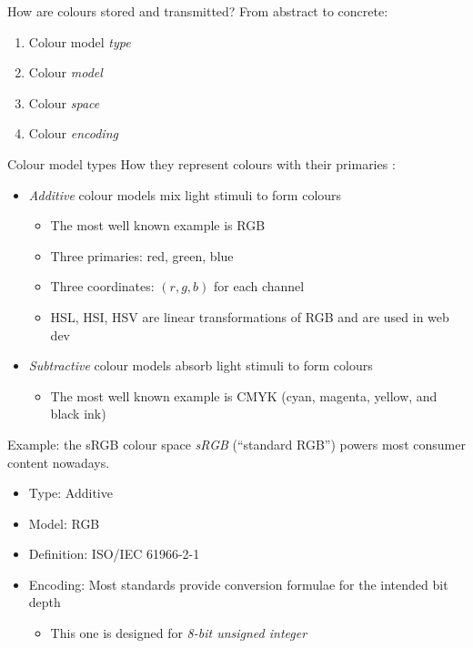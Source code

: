 \documentclass[aspectratio=169,usepdftitle=false]{fireshonks}
\begin{document}
\begin{frame}{How are colours stored and transmitted?}
    From abstract to concrete:
    \begin{enumerate}
        \item Colour model \emph{type}
        \item Colour \emph{model}
        \item Colour \emph{space}
        \item Colour \emph{encoding}
    \end{enumerate}
\end{frame}
\begin{frame}{Colour model types}
    How they represent colours with their primaries \autocite{allen23}:
    \begin{itemize}
        \item \emph{Additive} colour models mix light stimuli to form colours
              \begin{itemize}
                  \item The most well known example is RGB
                  \item Three primaries: red, green, blue
                  \item Three coordinates: $(r, g, b)$ for each channel
                  \item HSL, HSI, HSV are linear transformations of RGB and are used in web dev
              \end{itemize}
        \item \emph{Subtractive} colour models absorb light stimuli to form colours
              \begin{itemize}
                  \item The most well known example is CMYK (cyan, magenta, yellow, and black ink)
              \end{itemize}
    \end{itemize}
\end{frame}
\begin{frame}{Example: the sRGB colour space}
    \emph{sRGB} (\enquote{standard RGB}) powers most consumer content nowadays.
    \begin{itemize}
        \item Type: Additive
        \item Model: RGB
        \item Definition: ISO/IEC 61966-2-1 \parencite*{srgb2002}
        \item Encoding: Most standards provide conversion formulae for the intended bit depth
              \begin{itemize}
                  \item This one is designed for \emph{8-bit unsigned integer}
              \end{itemize}
    \end{itemize}
\end{frame}
\end{document}
